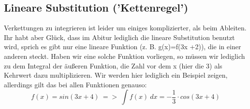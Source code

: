 \subsection{Lineare Substitution ('Kettenregel')}
	Verkettungen zu integrieren ist leider um einiges komplizierter, als beim
	Ableiten. Ihr habt aber Glück, dass im Abitur lediglich die lineare
	Substitution benutzt wird, sprich es gibt nur eine lineare Funktion (z. B.
	g(x)=f(3x +2)), die in einer anderen steckt. Haben wir eine solche Funktion
	vorliegen, so müssen wir lediglich zu dem Integral der äußeren Funktion, die
	Zahl vor dem x (hier die 3) als Kehrwert dazu multiplizieren. Wir werden hier
	lediglich ein Beispiel zeigen, allerdings gilt das bei allen Funktionen
	genauso:
	\[f(x)=sin(3x+4)\ =>\ \int f(x)\ dx=-\frac{1}{3}\cdot cos(3x+4)\]
